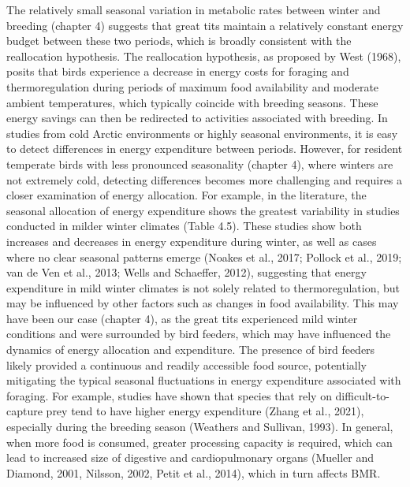 \documentclass[10pt, twoside]{book} %
\begin{document}
The relatively small seasonal variation in metabolic rates between winter and breeding (chapter 4) suggests that great tits maintain a relatively constant energy budget between these two periods, which is broadly consistent with the reallocation hypothesis. The reallocation hypothesis, as proposed by West (1968), posits that birds experience a decrease in energy costs for foraging and thermoregulation during periods of maximum food availability and moderate ambient temperatures, which typically coincide with breeding seasons. These energy savings can then be redirected to activities associated with breeding. In studies from cold Arctic environments or highly seasonal environments, it is easy to detect differences in energy expenditure between periods. However, for resident temperate birds with less pronounced seasonality (chapter 4), where winters are not extremely cold, detecting differences becomes more challenging and requires a closer examination of energy allocation. For example, in the literature, the seasonal allocation of energy expenditure shows the greatest variability in studies conducted in milder winter climates (Table 4.5). These studies show both increases and decreases in energy expenditure during winter, as well as cases where no clear seasonal patterns emerge (Noakes et al., 2017; Pollock et al., 2019; van de Ven et al., 2013; Wells and Schaeffer, 2012), suggesting that energy expenditure in mild winter climates is not solely related to thermoregulation, but may be influenced by other factors such as changes in food availability. This may have been our case (chapter 4), as the great tits experienced mild winter conditions and were surrounded by bird feeders, which may have influenced the dynamics of energy allocation and expenditure. The presence of bird feeders likely provided a continuous and readily accessible food source, potentially mitigating the typical seasonal fluctuations in energy expenditure associated with foraging. For example, studies have shown that species that rely on difficult-to-capture prey tend to have higher energy expenditure (Zhang et al., 2021), especially during the breeding season (Weathers and Sullivan, 1993). In general, when more food is consumed, greater processing capacity is required, which can lead to increased size of digestive and cardiopulmonary organs (Mueller and Diamond, 2001, Nilsson, 2002, Petit et al., 2014), which in turn affects BMR. \\
\end{document}
